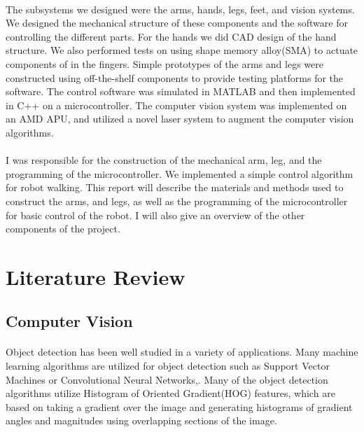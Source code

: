 \documentclass[letterpaper,12pt]{article}
\begin{document}
\paragraph{}The subsystems we designed were the arms, hands, legs, feet, and
vision systems.  We designed the mechanical structure of these components and
the software for controlling the different parts. For the hands we did CAD
design of the hand structure. We also performed tests on using shape memory
alloy(SMA) to actuate components of in the fingers. Simple prototypes of the
arms and legs were constructed using off-the-shelf components to provide testing
platforms for the software. The control software was simulated in MATLAB and
then implemented in C++ on a microcontroller. The computer vision system was
implemented on an AMD APU, and utilized a novel laser system to augment the
computer vision algorithms.

\paragraph{}I was responsible for the construction of the mechanical arm, leg,
and the programming of the microcontroller. We implemented a simple control
algorithm for robot walking. This report will describe the materials and methods
used to construct the arms, and legs, as well as the programming of the
microcontroller for basic control of the robot. I will also give an overview of
the other components of the project.

\section{Literature Review}
\subsection{Computer Vision}
\paragraph{}Object detection has been well studied in a variety of applications.
Many machine learning algorithms are utilized for object detection such as
Support Vector Machines or Convolutional Neural
Networks\cite{Barbu2012},\cite{krizhevsky2012imagenet}. Many of the object
detection algorithms utilize Histogram of Oriented Gradient(HOG) features, which
are based on taking a gradient over the image and generating histograms of
gradient angles and magnitudes using overlapping sections of the
image\cite{Dalal2005}. 
\end{document}
